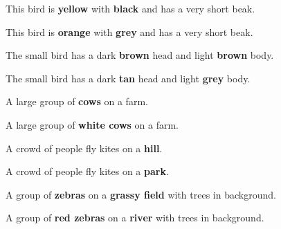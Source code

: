 \documentclass{article}
\begin{document}
\begin{figure}[t]
\begin{minipage}{0.092\textwidth}
\centering
\tiny{This bird is \textbf{yellow} with \textbf{black} and has a very short beak.}
\end{minipage}
\begin{minipage}{0.092\textwidth}
\centering
\tiny{This bird is \textbf{orange} with \textbf{grey} and has a very short beak.}
\end{minipage}
\noindent\begin{minipage}{0.092\textwidth}
\centering
\tiny{The small bird has a dark \textbf{brown} head and light \textbf{brown} body.}
\end{minipage}
\noindent\begin{minipage}{0.092\textwidth}
\centering
\tiny{The small bird has a dark \textbf{tan} head and light \textbf{grey} body.}
\end{minipage}
\noindent\begin{minipage}{0.092\textwidth}
\centering
\tiny{A large group of \textbf{cows} on a farm.}
\end{minipage}
\noindent\begin{minipage}{0.092\textwidth}
\centering
\tiny{A large group of \textbf{white cows} on a farm.}
\end{minipage}
\noindent\begin{minipage}{0.092\textwidth}
\centering
\tiny{A crowd of people fly kites on a \textbf{hill}.}
\end{minipage}
\noindent\begin{minipage}{0.092\textwidth}
\centering
\tiny{A crowd of people fly kites on a \textbf{park}.}
\end{minipage}
\noindent\begin{minipage}{0.092\textwidth}
\centering
\tiny{A group of \textbf{zebras} on a \textbf{grassy field} with trees in background.}
\end{minipage}
\noindent\begin{minipage}{0.092\textwidth}
\centering
\tiny{A group of \textbf{red zebras} on a \textbf{river} with trees in background.}
\end{minipage}
\smallskip


\end{figure}
\end{document}
